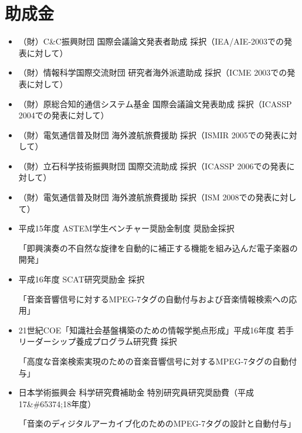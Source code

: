 \section*{助成金}
\begin{itemize}
  
\item 
（財）C\&C振興財団 国際会議論文発表者助成 採択（IEA/AIE-2003での発表に対して）\par

\item 
（財）情報科学国際交流財団 研究者海外派遣助成 採択（ICME 2003での発表に対して）\par

\item 
（財）原総合知的通信システム基金 国際会議論文発表助成 採択（ICASSP 2004での発表に対して）\par

\item 
（財）電気通信普及財団 海外渡航旅費援助 採択（ISMIR 2005での発表に対して）\par

\item 
（財）立石科学技術振興財団 国際交流助成 採択（ICASSP 2006での発表に対して）\par

\item 
（財）電気通信普及財団 海外渡航旅費援助 採択（ISM 2008での発表に対して）\par

\item 
平成15年度 ASTEM学生ベンチャー奨励金制度 奨励金採択\par
「即興演奏の不自然な旋律を自動的に補正する機能を組み込んだ電子楽器の開発」\par

\item 
平成16年度 SCAT研究奨励金 採択\par
「音楽音響信号に対するMPEG-7タグの自動付与および音楽情報検索への応用」\par

\item 
21世紀COE「知識社会基盤構築のための情報学拠点形成」平成16年度 若手リーダーシップ養成プログラム研究費 採択\par
「高度な音楽検索実現のための音楽音響信号に対するMPEG-7タグの自動付与」\par

\item 
日本学術振興会 科学研究費補助金 特別研究員研究奨励費（平成17\&\#65374;18年度）\par
「音楽のディジタルアーカイブ化のためのMPEG-7タグの設計と自動付与」\par


\end{itemize}
